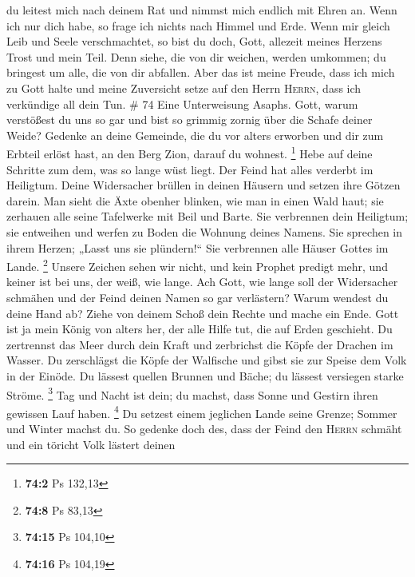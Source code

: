  du leitest mich nach deinem Rat und nimmst mich endlich
mit Ehren an.  Wenn ich nur dich habe, so frage ich
nichts nach Himmel und Erde.  Wenn mir gleich Leib und
Seele verschmachtet, so bist du doch, Gott, allezeit meines Herzens
Trost und mein Teil.  Denn siehe, die von dir weichen,
werden umkommen; du bringest um alle, die von dir abfallen.
 Aber das ist meine Freude, dass ich mich zu Gott halte
und meine Zuversicht setze auf den Herrn \textsc{Herrn}, dass ich
verkündige all dein Tun. \# 74  Eine Unterweisung Asaphs.
Gott, warum verstößest du uns so gar und bist so grimmig zornig über die
Schafe deiner Weide?  Gedenke an deine Gemeinde, die du
vor alters erworben und dir zum Erbteil erlöst hast, an den Berg Zion,
darauf du wohnest. \footnote{\textbf{74:2} Ps 132,13} 
Hebe auf deine Schritte zum dem, was so lange wüst liegt. Der Feind hat
alles verderbt im Heiligtum.  Deine Widersacher brüllen in
deinen Häusern und setzen ihre Götzen darein.  Man sieht
die Äxte obenher blinken, wie man in einen Wald haut;  sie
zerhauen alle seine Tafelwerke mit Beil und Barte.  Sie
verbrennen dein Heiligtum; sie entweihen und werfen zu Boden die Wohnung
deines Namens.  Sie sprechen in ihrem Herzen; „Lasst uns
sie plündern!{}`` Sie verbrennen alle Häuser Gottes im Lande.
\footnote{\textbf{74:8} Ps 83,13}  Unsere Zeichen sehen
wir nicht, und kein Prophet predigt mehr, und keiner ist bei uns, der
weiß, wie lange.  Ach Gott, wie lange soll der
Widersacher schmähen und der Feind deinen Namen so gar verlästern?
 Warum wendest du deine Hand ab? Ziehe von deinem Schoß
dein Rechte und mache ein Ende.  Gott ist ja mein König
von alters her, der alle Hilfe tut, die auf Erden geschieht.
 Du zertrennst das Meer durch dein Kraft und zerbrichst
die Köpfe der Drachen im Wasser.  Du zerschlägst die
Köpfe der Walfische und gibst sie zur Speise dem Volk in der Einöde.
 Du lässest quellen Brunnen und Bäche; du lässest
versiegen starke Ströme. \footnote{\textbf{74:15} Ps 104,10}
 Tag und Nacht ist dein; du machst, dass Sonne und
Gestirn ihren gewissen Lauf haben. \footnote{\textbf{74:16} Ps 104,19}
 Du setzest einem jeglichen Lande seine Grenze; Sommer
und Winter machst du.  So gedenke doch des, dass der
Feind den \textsc{Herrn} schmäht und ein töricht Volk lästert deinen
